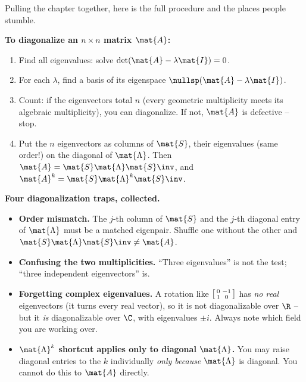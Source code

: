 Pulling the chapter together, here is the full procedure and the places people
stumble.

\begin{focusbox}
\textbf{To diagonalize an $n\times n$ matrix $\mat{A}$:}
\begin{enumerate}
  \item Find all eigenvalues: solve $\det(\mat{A}-\lambda\mat{I}) = 0$.
  \item For each $\lambda$, find a basis of its eigenspace
        $\nullsp(\mat{A}-\lambda\mat{I})$.
  \item Count: if the eigenvectors total $n$ (every geometric multiplicity meets
        its algebraic multiplicity), you can diagonalize. If not, $\mat{A}$ is
        defective -- stop.
  \item Put the $n$ eigenvectors as columns of $\mat{S}$, their eigenvalues
        (same order!) on the diagonal of $\mat{\Lambda}$. Then $\mat{A} =
        \mat{S}\mat{\Lambda}\mat{S}\inv$, and $\mat{A}^k =
        \mat{S}\mat{\Lambda}^k\mat{S}\inv$.
\end{enumerate}
\end{focusbox}

\begin{trapbox}
\textbf{Four diagonalization traps, collected.}
\begin{itemize}
  \item \textbf{Order mismatch.} The $j$-th column of $\mat{S}$ and the $j$-th
        diagonal entry of $\mat{\Lambda}$ must be a matched eigenpair. Shuffle
        one without the other and $\mat{S}\mat{\Lambda}\mat{S}\inv \neq \mat{A}$.
  \item \textbf{Confusing the two multiplicities.} ``Three eigenvalues'' is not
        the test; ``three independent eigenvectors'' is.
  \item \textbf{Forgetting complex eigenvalues.} A rotation like
        $\begin{bsmallmatrix}0&-1\\1&0\end{bsmallmatrix}$ has \emph{no real}
        eigenvectors (it turns every real vector), so it is not diagonalizable
        over $\R$ -- but it \emph{is} diagonalizable over $\C$, with eigenvalues
        $\pm i$. Always note which field you are working over.
  \item \textbf{$\mat{\Lambda}^k$ shortcut applies only to diagonal
        $\mat{\Lambda}$.} You may raise diagonal entries to the $k$ individually
        \emph{only because} $\mat{\Lambda}$ is diagonal. You cannot do this to
        $\mat{A}$ directly.
\end{itemize}
\end{trapbox}

